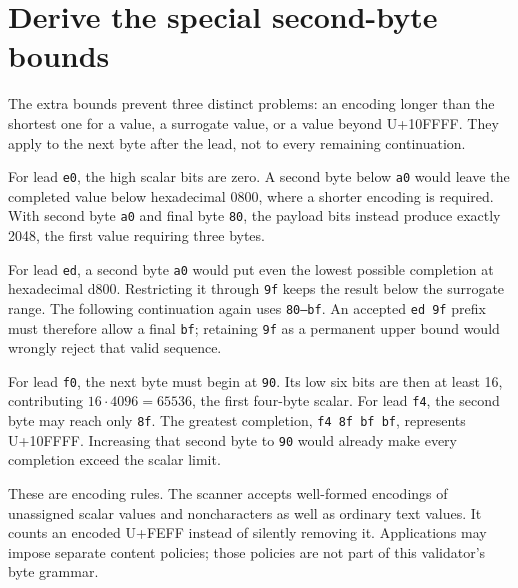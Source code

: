 \section{Derive the special second-byte bounds}
The extra bounds prevent three distinct problems: an encoding longer than the
shortest one for a value, a surrogate value, or a value beyond U+10FFFF. They apply
to the next byte after the lead, not to every remaining continuation.

For lead \texttt{e0}, the high scalar bits are zero. A second byte below
\texttt{a0} would leave the completed value below hexadecimal 0800, where a shorter
encoding is required. With second byte \texttt{a0} and final byte \texttt{80}, the
payload bits instead produce exactly 2048, the first value requiring three bytes.

For lead \texttt{ed}, a second byte \texttt{a0} would put even the lowest possible
completion at hexadecimal d800. Restricting it through \texttt{9f} keeps the result
below the surrogate range. The following continuation again uses \texttt{80--bf}.
An accepted \texttt{ed 9f} prefix must therefore allow a final \texttt{bf}; retaining
\texttt{9f} as a permanent upper bound would wrongly reject that valid sequence.

For lead \texttt{f0}, the next byte must begin at \texttt{90}. Its low six bits are
then at least 16, contributing \(16\cdot4096=65536\), the first four-byte scalar.
For lead \texttt{f4}, the second byte may reach only \texttt{8f}. The greatest
completion, \texttt{f4 8f bf bf}, represents U+10FFFF. Increasing that second byte to
\texttt{90} would already make every completion exceed the scalar limit.

These are encoding rules. The scanner accepts well-formed encodings of unassigned
scalar values and noncharacters as well as ordinary text values. It counts an
encoded U+FEFF instead of silently removing it. Applications may impose separate
content policies; those policies are not part of this validator's byte grammar.
